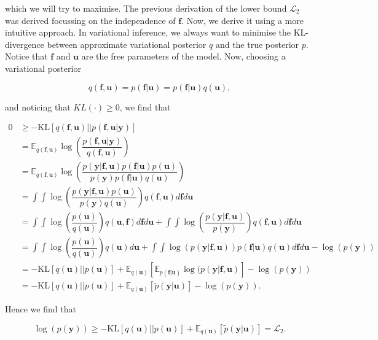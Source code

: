 \documentclass[12pt,a4paper,oneside]{book}
\begin{document}
which we will try to maximise. The previous derivation of the lower bound $\mathcal{L}_2$ was derived focussing on the independence of $\bm{f}$. Now, we derive it using a more intuitive approach. In variational inference, we always want to minimise the KL-divergence between approximate variational posterior $q$ and the true posterior $p$. Notice that $\bm{f}$ and $\bm{u}$ are the free parameters of the model. Now, choosing a variational posterior 

\begin{equation}
q(\bm{f}, \bm{u}) = p(\bm{f}|\bm{u}) = p(\bm{f}| \bm{u}) q(\bm{u}),
\end{equation}

and noticing that $KL(\cdot) \geq 0$, we find that 

\begin{equation}\label{variational}
\begin{aligned}
0 & \geq - \text{KL}[q(\bm{f}, \bm{u}) || p(\bm{f}, \bm{u} |\bm{y})]  \\ &= \mathbb{E}_{q(\bm{f}, \bm{u})} \log \left( \dfrac{p(\bm{f}, \bm{u}| \bm{y})}{q(\bm{f}, \bm{u}) }\right) \\
&= \mathbb{E}_{q(\bm{f},\bm{u})} \log \left( \dfrac{p(\bm{y}|\bm{f}, \bm{u})p(\bm{f}|\bm{u})p(\bm{u})}{p(\bm{y})p(\bm{f}|\bm{u}) q(\bm{u})} \right) \\
&= \int \int \log \left( \dfrac{p(\bm{y}|\bm{f}, \bm{u}) p(\bm{u})}{p(\bm{y}) q(\bm{u})}\right)  q(\bm{f}, \bm{u}) d\bm{f} d\bm{u}  \\
&= \int \int \log \left( \dfrac{p(\bm{u})}{q(\bm{u})} \right) q(\bm{u}, \bm{f}) d\bm{f} d\bm{u} + \int \int \log  \left( \dfrac{p(\bm{y}| \bm{f} , \bm{u})}{p(\bm{y})} \right) q(\bm{f}, \bm{u}) d\bm{f} d\bm{u} \\ 
&= \int \int \log \left( \dfrac{p(\bm{u})}{q(\bm{u})} \right) q(\bm{u}) d\bm{u} + \int \int \log(p(\bm{y}| \bm{f} , \bm{u})) p(\bm{f}|\bm{u}) q(\bm{u})  d\bm{f} d\bm{u} - \log (p(\bm{y})) \\
&= - \text{KL}[q(\bm{u})||p(\bm{u})] + \mathbb{E}_{q(\bm{u})}[\mathbb{E}_{p(\bm{f}| \bm{u})} \log (p(\bm{y}| \bm{f}, \bm{u})] - \log (p(\bm{y}))  \\
&= - \text{KL}[q(\bm{u})||p(\bm{u})] + \mathbb{E}_{q(\bm{u})}[\tilde{p}(\bm{y}|\bm{u})] - \log (p(\bm{y})).
\end{aligned}
\end{equation}

Hence we find that 

\begin{equation}
\log (p(\bm{y})) \geq - \text{KL}[q(\bm{u})||p(\bm{u})] + \mathbb{E}_{q(\bm{u})}[\tilde{p}(\bm{y}|\bm{u})] = \mathcal{L}_2.
\end{equation}
\end{document}
